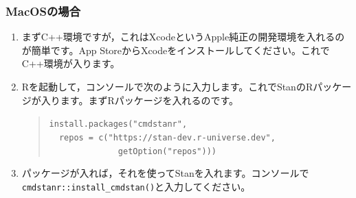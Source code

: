 \documentclass{ltjbook}
\begin{document}
\subsubsection{MacOSの場合}
\begin{enumerate}
    \item まずC++環境ですが，これはXcodeというApple純正の開発環境を入れるのが簡単です。App StoreからXcodeをインストールしてください。これでC++環境が入ります。
    \item Rを起動して，コンソールで次のように入力します。これでStanのRパッケージが入ります。まずRパッケージを入れるのです。
\begin{quote}
\texttt{install.packages("cmdstanr",}\\
\texttt{\ \ repos = c("https://stan-dev.r-universe.dev",}\\
\texttt{\ \ \ \ \ \ \ \ \ \ \ \ \ \ getOption("repos")))}
\end{quote}

    \item パッケージが入れば，それを使ってStanを入れます。コンソールで\verb|cmdstanr::install_cmdstan()|と入力してください。
\end{enumerate}
\end{document}
